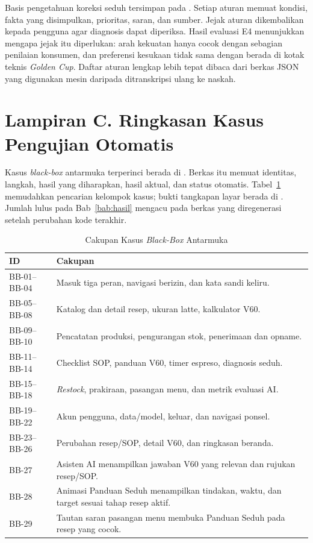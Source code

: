 Basis pengetahuan koreksi seduh tersimpan pada . Setiap aturan memuat kondisi, fakta yang disimpulkan, prioritas, saran, dan sumber. Jejak aturan dikembalikan kepada pengguna agar diagnosis dapat diperiksa. Hasil evaluasi E4 menunjukkan mengapa jejak itu diperlukan: arah kekuatan hanya cocok dengan sebagian penilaian konsumen, dan preferensi kesukaan tidak sama dengan berada di kotak teknis \textit{Golden Cup}. Daftar aturan lengkap lebih tepat dibaca dari berkas JSON yang digunakan mesin daripada ditranskripsi ulang ke naskah.

\section*{Lampiran C. Ringkasan Kasus Pengujian Otomatis}
{}

Kasus \textit{black-box} antarmuka terperinci berada di . Berkas itu memuat identitas, langkah, hasil yang diharapkan, hasil aktual, dan status otomatis. Tabel~\ref{tab:lampiran-kasus} memudahkan pencarian kelompok kasus; bukti tangkapan layar berada di . Jumlah lulus pada Bab~\ref{bab:hasil} mengacu pada berkas yang diregenerasi setelah perubahan kode terakhir.

\begin{table}[htbp]
\centering
\caption{Cakupan Kasus \textit{Black-Box} Antarmuka}
\label{tab:lampiran-kasus}
\begin{tabular}{lp{}}
\toprule
ID & Cakupan \\
\midrule
BB-01--BB-04 & Masuk tiga peran, navigasi berizin, dan kata sandi keliru. \\
BB-05--BB-08 & Katalog dan detail resep, ukuran latte, kalkulator V60. \\
BB-09--BB-10 & Pencatatan produksi, pengurangan stok, penerimaan dan opname. \\
BB-11--BB-14 & Checklist SOP, panduan V60, timer espreso, diagnosis seduh. \\
BB-15--BB-18 & \textit{Restock}, prakiraan, pasangan menu, dan metrik evaluasi AI. \\
BB-19--BB-22 & Akun pengguna, data/model, keluar, dan navigasi ponsel. \\
BB-23--BB-26 & Perubahan resep/SOP, detail V60, dan ringkasan beranda. \\
BB-27 & Asisten AI menampilkan jawaban V60 yang relevan dan rujukan resep/SOP. \\
BB-28 & Animasi Panduan Seduh menampilkan tindakan, waktu, dan target sesuai tahap resep aktif. \\
BB-29 & Tautan saran pasangan menu membuka Panduan Seduh pada resep yang cocok. \\
\bottomrule
\end{tabular}
\end{table}

